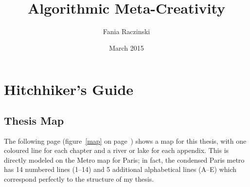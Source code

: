 \documentclass[11pt]{thesis} %
\title{Algorithmic Meta-Creativity}
\author{Fania Raczinski}
\date{March 2015}
\begin{document}
\pagestyle{fania}


\pagestyle{fania}\listoffigures
\clearpage


\section{Hitchhiker's Guide}
\subsection{Thesis Map}

\begin{figure}[!htbp]
\centering
  \def\svgwidth{\textwidth}
  
\end{figure}

\spirals

The following page (figure~\ref{map} on page~\pageref{map}) shows a map for this thesis, with one coloured line for each chapter and a river or lake for each appendix. This is directly modeled on the Metro map for Paris; in fact, the condensed Paris metro \autocite{ParisMetro} has 14 numbered lines (1--14) and 5 additional alphabetical lines (A--E) which correspond perfectly to the structure of my thesis.
\\
\end{document}
